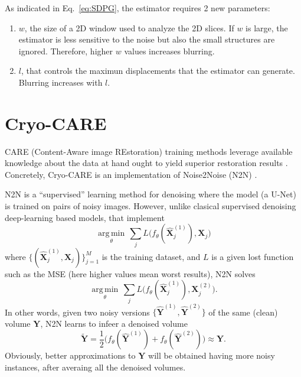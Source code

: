 \documentclass{article}
\begin{document}
As indicated in Eq.~\ref{eq:SDPG}, the estimator requires 2 new
parameters:
\begin{enumerate}
\item $w$, the size of a 2D window used to analyze the 2D slices. If
  $w$ is large, the estimator is less sensitive to the noise but also
  the small structures are ignored. Therefore, higher $w$ values
  increases blurring.
\item $l$, that controls the maximun displacements that the
  estimator can generate. Blurring increases with $l$.
\end{enumerate}




\section{Cryo-CARE \cite{buchholz2019cryo}}
CARE (Content-Aware image REstoration) training methods leverage
available knowledge about the data at hand ought to yield superior
restoration results \cite{weigert2018content}. Concretely, Cryo-CARE
is an implementation of Noise2Noise (N2N) \cite{lehtinen2018noise2noise}.

N2N is a ``supervised'' learning method for denoising where the model
(a U-Net) is trained on pairs of noisy images. However, unlike
clasical supervised denoising deep-learning based models, that
implement
\begin{equation}
  \underset{\theta}{\operatorname{arg\,min}} \, \sum_j L \big(f_\theta(\hat{\mathbf X}_j^{(1)}), {\mathbf X}_j\big)
\end{equation}
where $\{(\hat{\mathbf X}_j^{(1)}, {\mathbf X}_j)\}_{j=1}^M$ is the training
dataset, and $L$ is a given lost function such as the MSE (here higher
values mean worst results), N2N solves
\begin{equation}
  \underset{\theta}{\operatorname{arg\,min}} \, \sum_j L \big(f_\theta(\hat{\mathbf X}_j^{(1)}), {\mathbf X}_j^{(2)}\big).
\end{equation}
In other words, given two noisy versions
$\{\hat{\mathbf Y}^{(1)}, \hat{\mathbf Y}^{(2)}\}$ of the same (clean)
volume ${\mathbf Y}$, N2N learns to infeer a denoised volume
\begin{equation}
  \tilde{\mathbf Y}=\frac{1}{2}\big(f_\theta(\hat{\mathbf Y}^{(1)})+f_\theta(\hat{\mathbf Y}^{(2)})\big)\approx{\mathbf Y}.
\end{equation}
Obviously, better approximations to ${\mathbf Y}$ will be obtained
having more noisy instances, after averaing all the denoised volumes.
\end{document}
